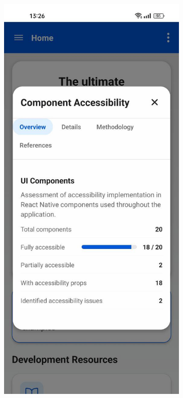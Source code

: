 \begin{figure}[ht]
    \centering
    \begin{subfigure}[b]{0.48\textwidth}
        \centering
        \includegraphics[width=\linewidth]{img/component-modal.jpg}

\end{subfigure}
\end{figure}
